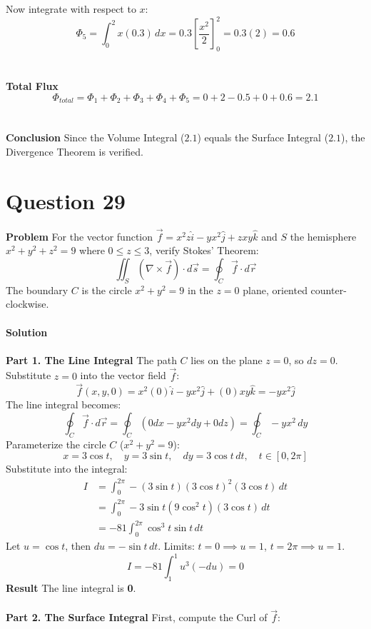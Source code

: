\documentclass{article}
\begin{document}
Now integrate with respect to $x$:
\[
	\Phi_5 = \int_0^2 x(0.3) \, dx = 0.3 \left[ \frac{x^2}{2} \right]_0^2 = 0.3(2) = 0.6
\]
\\
\\
\textbf{Total Flux}
\[
	\Phi_{total} = \Phi_1 + \Phi_2 + \Phi_3 + \Phi_4 + \Phi_5 = 0 + 2 - 0.5 + 0 + 0.6 = 2.1
\]
\\
\\
\textbf{Conclusion}
Since the Volume Integral ($2.1$) equals the Surface Integral ($2.1$), the
Divergence Theorem is verified.

\pagebreak


\section{Question 29}
\textbf{Problem}
For the vector function $\vec{f} = x^2 z \hat{i} - yx^2 \hat{j} + zxy \hat{k}$
and $S$ the hemisphere $x^2 + y^2 + z^2 = 9$ where $0 \le z \le 3$, verify
Stokes' Theorem:
\[
	\iint_S (\nabla \times \vec{f}) \cdot d\vec{s} = \oint_C \vec{f} \cdot d\vec{r}
\]
The boundary $C$ is the circle $x^2 + y^2 = 9$ in the $z=0$ plane, oriented
counter-clockwise.
\\
\\
\textbf{Solution}
\\
\\
\textbf{Part 1. The Line Integral}
The path $C$ lies on the plane $z=0$, so $dz=0$.
Substitute $z=0$ into the vector field $\vec{f}$:
\[
	\vec{f}(x,y,0) = x^2(0)\hat{i} - yx^2\hat{j} + (0)xy\hat{k} = -yx^2\hat{j}
\]
The line integral becomes:
\[
	\oint_C \vec{f} \cdot d\vec{r} = \oint_C (0 dx - yx^2 dy + 0 dz) = \oint_C -yx^2 \, dy
\]
Parameterize the circle $C$ ($x^2 + y^2 = 9$):
\[
	x = 3\cos t, \quad y = 3\sin t, \quad dy = 3\cos t \, dt, \quad t \in [0, 2\pi]
\]
Substitute into the integral:
\begin{align*}
	I & = \int_0^{2\pi} -(3\sin t)(3\cos t)^2 (3\cos t) \, dt \\
	  & = \int_0^{2\pi} -3\sin t (9\cos^2 t) (3\cos t) \, dt  \\
	  & = -81 \int_0^{2\pi} \cos^3 t \sin t \, dt
\end{align*}
Let $u = \cos t$, then $du = -\sin t \, dt$.
Limits: $t=0 \implies u=1$, $t=2\pi \implies u=1$.
\[
	I = -81 \int_1^1 u^3 (-du) = 0
\]
\textbf{Result} The line integral is \textbf{0}.
\\
\\
\textbf{Part 2. The Surface Integral}
First, compute the Curl of $\vec{f}$:
\end{document}
